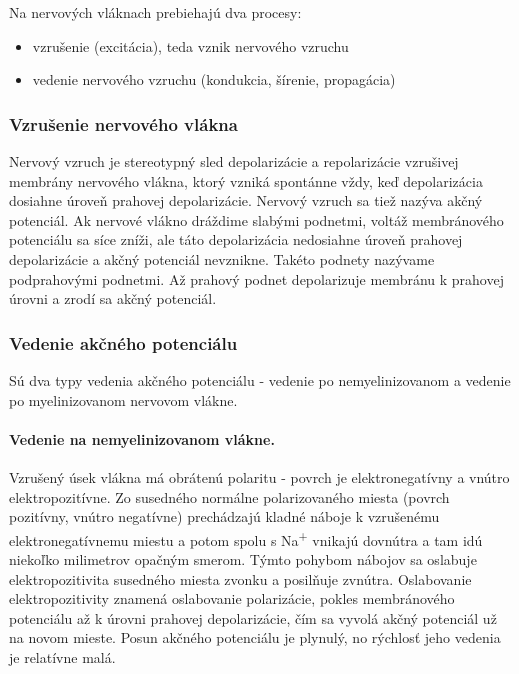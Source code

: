 Na nervových vláknach prebiehajú dva procesy: 
\begin{itemize}
  \item vzrušenie (excitácia), teda vznik nervového vzruchu
  \item vedenie nervového vzruchu (kondukcia, šírenie, propagácia)
\end{itemize}

\subsubsection{Vzrušenie nervového vlákna}

Nervový vzruch je stereotypný sled depolarizácie a repolarizácie vzrušivej membrány nervového vlákna, ktorý vzniká spontánne vždy, keď depolarizácia dosiahne úroveň prahovej depolarizácie.
Nervový vzruch sa tiež nazýva akčný potenciál. Ak nervové vlákno dráždime slabými podnetmi, voltáž membránového potenciálu sa síce zníži, ale táto depolarizácia nedosiahne úroveň prahovej
depolarizácie a akčný potenciál nevznikne. Takéto podnety nazývame podprahovými podnetmi. Až prahový podnet depolarizuje membránu k prahovej úrovni a zrodí sa akčný potenciál.

\subsubsection{Vedenie akčného potenciálu}

Sú dva typy vedenia akčného potenciálu - vedenie po nemyelinizovanom a vedenie po myelinizovanom nervovom vlákne.

\paragraph{Vedenie na nemyelinizovanom vlákne.} 
Vzrušený úsek vlákna má obrátenú polaritu - povrch je elektronegatívny a vnútro elektropozitívne. Zo susedného normálne polarizovaného miesta (povrch pozitívny, vnútro negatívne) prechádzajú
kladné náboje k vzrušenému elektronegatívnemu miestu a potom spolu s Na\textsuperscript{+} vnikajú dovnútra a tam idú niekoľko milimetrov opačným smerom. Týmto pohybom nábojov sa oslabuje 
elektropozitivita susedného miesta zvonku a posilňuje zvnútra. Oslabovanie elektropozitivity znamená oslabovanie polarizácie, pokles membránového potenciálu až k úrovni prahovej depolarizácie,
čím sa vyvolá akčný potenciál už na novom mieste. Posun akčného potenciálu je plynulý, no rýchlosť jeho vedenia je relatívne malá.

